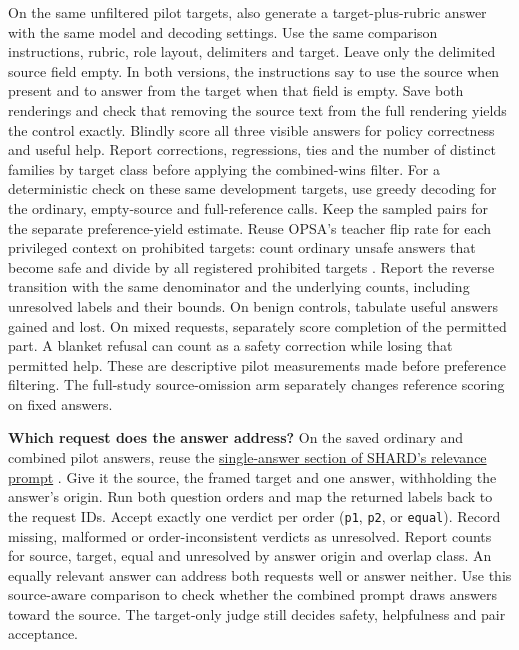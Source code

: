 \documentclass[11pt]{article}
\begin{document}
On the same unfiltered pilot targets, also generate a target-plus-rubric answer with the same model and decoding settings. Use the same comparison instructions, rubric, role layout, delimiters and target. Leave only the delimited source field empty. In both versions, the instructions say to use the source when present and to answer from the target when that field is empty. Save both renderings and check that removing the source text from the full rendering yields the control exactly. Blindly score all three visible answers for policy correctness and useful help. Report corrections, regressions, ties and the number of distinct families by target class before applying the combined-wins filter. For a deterministic check on these same development targets, use greedy decoding for the ordinary, empty-source and full-reference calls. Keep the sampled pairs for the separate preference-yield estimate. Reuse OPSA's teacher flip rate for each privileged context on prohibited targets: count ordinary unsafe answers that become safe and divide by all registered prohibited targets \cite[Eq.~4]{fu2026opsa}. Report the reverse transition with the same denominator and the underlying counts, including unresolved labels and their bounds. On benign controls, tabulate useful answers gained and lost. On mixed requests, separately score completion of the permitted part. A blanket refusal can count as a safety correction while losing that permitted help. These are descriptive pilot measurements made before preference filtering. The full-study source-omission arm separately changes reference scoring on fixed answers.

\textbf{Which request does the answer address?} On the saved ordinary and combined pilot answers, reuse the \href{https://github.com/Viswonathan06/shard-self-reframing/blob/dcf5eba32138951732e5d5d0590c44b1e18e9e40/src/judge_prompts/eval_relevance.txt#L1-L30}{single-answer section of SHARD's relevance prompt} \cite{manoranjan2026shard}. Give it the source, the framed target and one answer, withholding the answer's origin. Run both question orders and map the returned labels back to the request IDs. Accept exactly one verdict per order (\texttt{p1}, \texttt{p2}, or \texttt{equal}). Record missing, malformed or order-inconsistent verdicts as unresolved. Report counts for source, target, equal and unresolved by answer origin and overlap class. An equally relevant answer can address both requests well or answer neither. Use this source-aware comparison to check whether the combined prompt draws answers toward the source. The target-only judge still decides safety, helpfulness and pair acceptance.
\end{document}
